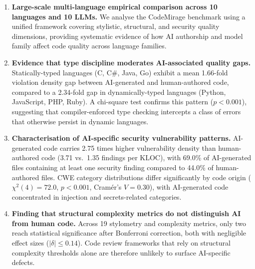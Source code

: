 \begin{enumerate}

\item \textbf{Large-scale multi-language empirical comparison across 10 languages and 10 LLMs.} We analyse the CodeMirage benchmark using a unified framework covering stylistic, structural, and security quality dimensions, providing systematic evidence of how AI authorship and model family affect code quality across language families.

\item \textbf{Evidence that type discipline moderates AI-associated quality gaps.} Statically-typed languages (C, C\#, Java, Go) exhibit a mean 1.66-fold violation density gap between AI-generated and human-authored code, compared to a 2.34-fold gap in dynamically-typed languages (Python, JavaScript, PHP, Ruby). A chi-square test confirms this pattern ($p < 0.001$), suggesting that compiler-enforced type checking intercepts a class of errors that otherwise persist in dynamic languages.

\item \textbf{Characterisation of AI-specific security vulnerability patterns.} AI-generated code carries 2.75 times higher vulnerability density than human-authored code (3.71 vs.\ 1.35 findings per KLOC), with 69.0\% of AI-generated files containing at least one security finding compared to 44.0\% of human-authored files. CWE category distributions differ significantly by code origin ($\chi^2(4) = 72.0$, $p < 0.001$, Cram\'{e}r's $V = 0.30$), with AI-generated code concentrated in injection and secrets-related categories.

\item \textbf{Finding that structural complexity metrics do not distinguish AI from human code.} Across 19 stylometry and complexity metrics, only two reach statistical significance after Bonferroni correction, both with negligible effect sizes ($|\delta| \leq 0.14$). Code review frameworks that rely on structural complexity thresholds alone are therefore unlikely to surface AI-specific defects.

\end{enumerate}
